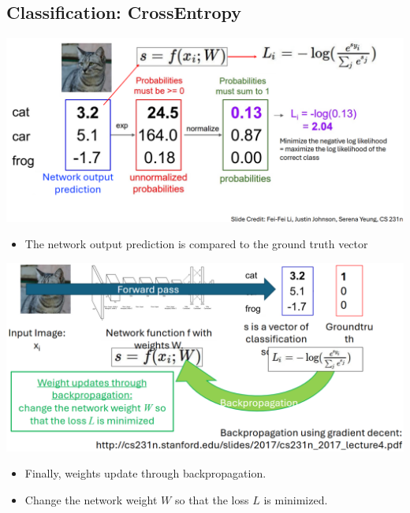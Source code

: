 \documentclass[10pt]{article}
\begin{document}
\subsection*{Classification: CrossEntropy}
\begin{center} 
	\includegraphics*[width=\textwidth]{L2_25.png} 
\end{center}
\begin{itemize}
	\item The network output prediction is compared to the ground truth vector
\end{itemize}
\begin{center} 
	\includegraphics*[width=\textwidth]{L2_26.png} 
\end{center}
\begin{itemize}
	\item Finally, weights update through backpropagation.
	\item Change the network weight $W$ so that the loss $L$ is minimized.
\end{itemize}
\end{document}
